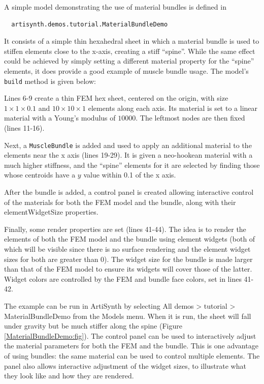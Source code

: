 A simple model demonstrating the use of material bundles
is defined in
%
\begin{verbatim}
  artisynth.demos.tutorial.MaterialBundleDemo
\end{verbatim}
%
It consists of a simple thin hexahedral sheet in which a material
bundle is used to stiffen elements close to the x-axis,
creating a stiff ``spine''. While the same effect could be achieved by
simply setting a different material property for the ``spine''
elements, it does provide a good example of muscle bundle usage.
%
The model's {\tt build} method is given below:
\lstset{numbers=left}
\iflatexml

\else

\fi
\lstset{numbers=none}

Lines 6-9 create a thin FEM hex sheet, centered on the origin, with
size $1 \times 1 \times 0.1$ and $10 \times 10 \times 1$ elements
along each axis. Its material is set to a linear material with a
Young's modulus of $10000$. The leftmost nodes are then fixed (lines
11-16).

Next, a {\tt MuscleBundle} is added and used to apply an additional
material to the elements near the x axis (lines 19-29). It is given a
neo-hookean material with a much higher stiffness, and the ``spine''
elements for it are selected by finding those whose centroids 
have a $y$ value within 0.1 of the x axis.

After the bundle is added, a control panel is created allowing
interactive control of the materials for both the FEM model and the
bundle, along with their {\sf elementWidgetSize} properties.

Finally, some render properties are set (lines 41-44). The idea is to
render the elements of both the FEM model and the bundle using element
widgets (both of which will be visible since there is no surface
rendering and the element widget sizes for both are greater than 0).
The widget size for the bundle is made larger than that of the FEM
model to ensure its widgets will cover those of the latter. Widget
colors are controlled by the FEM and bundle face colors, set in lines
41-42.

The example can be run in ArtiSynth by selecting {\sf All demos >
tutorial > MaterialBundleDemo} from the {\sf Models} menu.  When it is
run, the sheet will fall under gravity but be much stiffer along the
spine (Figure \ref{MaterialBundleDemo:fig}). The control panel can be
used to interactively adjust the material parameters for both the FEM
and the bundle. This is one advantage of using bundles: the same
material can be used to control multiple elements. The panel also
allows interactive adjustment of the widget sizes, to illustrate what
they look like and how they are rendered.

